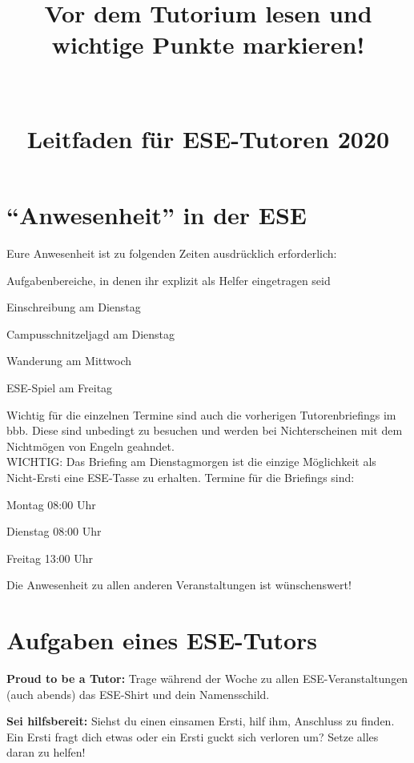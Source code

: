 \documentclass[a4paper,12pt]{scrreprt}
\begin{document}
\title{\huge{\textbf{Vor dem Tutorium lesen und wichtige Punkte markieren!}}\\\ \\\ \\{Leitfaden für ESE-Tutoren 2020}}


\date{}

\author{}
\maketitle

\section*{\enquote{Anwesenheit} in der ESE}
Eure Anwesenheit ist zu folgenden Zeiten ausdrücklich erforderlich:
\begin{itemize*}
    \item Aufgabenbereiche, in denen ihr explizit als Helfer eingetragen seid
    \item Einschreibung am Dienstag
    \item Campusschnitzeljagd am Dienstag
    \item Wanderung am Mittwoch
    \item ESE-Spiel am Freitag
\end{itemize*}
Wichtig für die einzelnen Termine sind auch die vorherigen Tutorenbriefings im bbb. Diese sind unbedingt zu besuchen und werden bei Nichterscheinen mit dem Nichtmögen von Engeln geahndet.\\
WICHTIG: Das Briefing am Dienstagmorgen ist die einzige Möglichkeit als Nicht-Ersti eine ESE-Tasse zu erhalten.
Termine für die Briefings sind:
\begin{itemize*}
    \item Montag        08:00 Uhr
    \item Dienstag      08:00 Uhr
    \item Freitag       13:00 Uhr
\end{itemize*}

Die Anwesenheit zu allen anderen Veranstaltungen ist wünschenswert!

\section*{Aufgaben eines ESE-Tutors}

\begin{itemize*}
    \item \textbf{Proud to be a Tutor:} Trage während der Woche zu allen ESE-Veranstaltungen (auch abends) das ESE-Shirt und dein Namensschild.
    \item \textbf{Sei hilfsbereit:} Siehst du einen einsamen Ersti, hilf ihm, Anschluss zu finden. Ein Ersti fragt dich etwas oder ein Ersti guckt sich verloren um? Setze alles daran zu helfen!
\end{itemize*}
\end{document}

